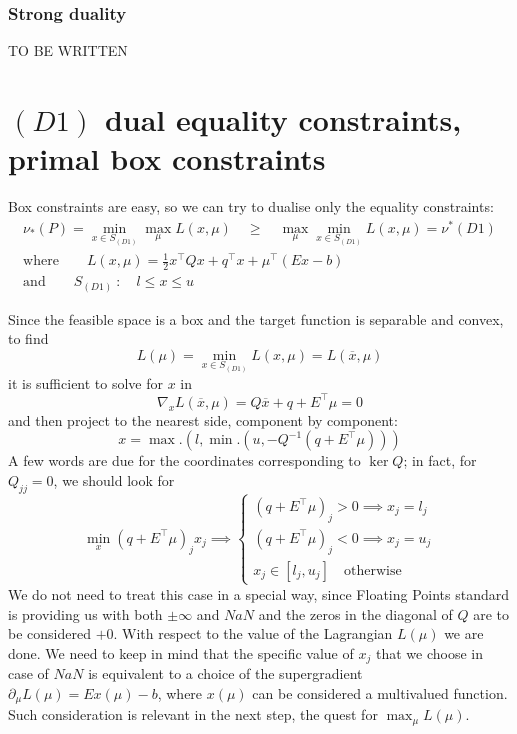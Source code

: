 \documentclass[twoside]{mfitjournal}
\begin{document}
\subsubsection*{Strong duality}
TO BE WRITTEN

\section*{$(D1)$ dual equality constraints, primal box constraints}
Box constraints are easy, so we can try to dualise only the equality constraints:
\begin{gather*}
    \nu_*(P) = \min_{x \in S_{(D1)}} \max_{\mu} L(x, \mu) \quad\ge\quad \max_{\mu} \min_{x \in S_{(D1)}} L(x, \mu) = \nu^*(D1)  \\
   \textrm{where}\qquad  L(x, \mu) = \frac{1}{2} x^\intercal Q x + q^\intercal x + \mu^\intercal (E x - b)  \\
    \textrm{and}\qquad  S_{(D1)} \: :\quad l \le x \le u
\end{gather*}

Since the feasible space is a box and the target function is separable and convex, to find
\[
    L(\mu) = \min_{x \in S_{(D1)}} L(x, \mu) = L(\overline{x}, \mu)
\]
it is sufficient to solve for $x$ in
\[
    \nabla_x L(\overbar{x}, \mu) = Q \overbar{x} + q + E^\intercal\mu = 0
\]
and then project to the nearest side, component by component:
\[
    x = \max.(l, \min.(u, -Q^{-1}(q + E^\intercal\mu)))
\]
A few words are due for the coordinates corresponding to $\ker Q$; in fact, for $Q_{j j} = 0$, we should look for
\[
    \min_x (q + E^\intercal \mu)_j x_j \implies \begin{cases}
        (q + E^\intercal \mu)_j > 0 \implies x_j = l_j \\
        (q + E^\intercal \mu)_j < 0 \implies x_j = u_j \\
        x_j \in [l_j, u_j] \quad \textrm{otherwise}
    \end{cases}
\]
We do not need to treat this case in a special way, since Floating Points standard is providing us with both $\pm\infty$ and $NaN$ and the zeros in the diagonal of $Q$ are to be considered $+0$. With respect to the value of the Lagrangian $L(\mu)$ we are done.
We need to keep in mind that the specific value of $x_j$ that we choose in case of $NaN$ is equivalent to a choice of the supergradient $\partial_\mu L(\mu) = E x(\mu) - b$, where $x(\mu)$ can be considered a multivalued function. Such consideration is relevant in the next step, the quest for $\max_\mu L(\mu)$.
\end{document}

